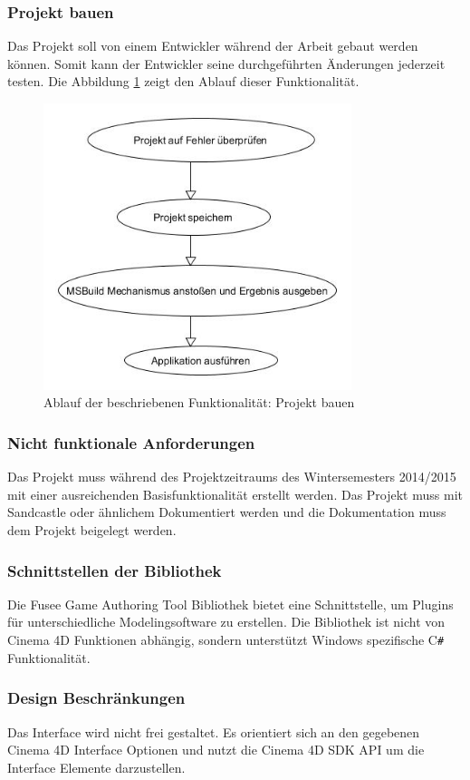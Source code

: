 \documentclass[pagesize, paper=a4, fontsize=12pt, titlepage=true, headings=small, headnosepline, abstractoff, liststotoc, nochapterprefix, plainheadsepline, twoside]{scrreprt}
\newcommand{\CSS}{C\texttt{\# }}
\begin{document}
\subsubsection{Projekt bauen}
Das Projekt soll von einem Entwickler während der Arbeit gebaut werden können. Somit kann der Entwickler seine durchgeführten Änderungen jederzeit testen. Die Abbildung \ref{re:projektbauen} zeigt den Ablauf dieser Funktionalität.
\begin{figure}[ht]
	\centering
	\includegraphics[width=9cm]{Bilder/ProjektBauen.jpg}
	\caption{Ablauf der beschriebenen Funktionalität: Projekt bauen}
	\label{re:projektbauen}
\end{figure}

\subsubsection{Nicht funktionale Anforderungen}
Das Projekt muss während des Projektzeitraums des Wintersemesters 2014/2015 mit einer ausreichenden Basisfunktionalität erstellt werden.
Das Projekt muss mit Sandcastle oder ähnlichem Dokumentiert werden und die Dokumentation muss dem Projekt beigelegt werden.

\subsubsection{Schnittstellen der Bibliothek}
Die Fusee Game Authoring Tool Bibliothek bietet eine Schnittstelle, um Plugins für unterschiedliche Modelingsoftware zu erstellen. Die Bibliothek ist nicht von Cinema 4D Funktionen abhängig, sondern unterstützt Windows spezifische \CSS Funktionalität. 

\subsubsection{Design Beschränkungen}
Das Interface wird nicht frei gestaltet. Es orientiert sich an den gegebenen Cinema 4D Interface Optionen und nutzt die Cinema 4D SDK API um die Interface Elemente darzustellen.
\end{document}
